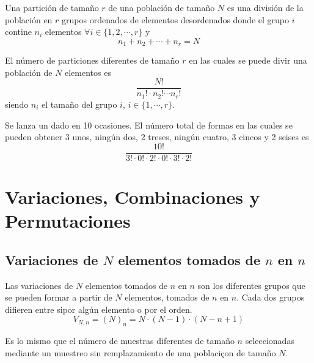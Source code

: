 \begin{defn}[Partición]
  Una partición de tamaño $r$ de una población de tamaño $N$ es una división de la población en $r$ grupos ordenados de elementos desordenados donde el grupo $i$ contine $n_{i}$ elementos $\forall i \in \{ 1,2, \cdots, r \}$ y
  \[ 
    n_{1} + n_{2} + \cdots + n_{r} = N 
  \] 
\end{defn}

\begin{theo}
  El número de particiones diferentes de tamaño $r$ en las cuales se puede divir una población de $N$ elementos es
  \[ 
    \frac{N!}{n_{1}! \cdot n_{2}! \cdots n_{r}!} 
  \] 
  siendo $n_{i}$ el tamaño del grupo $i$, $i \in \{ 1, \cdots, r \}$.
\end{theo}

\begin{ejm}
  Se lanza un dado en 10 ocasiones. El número total de formas en las cuales se pueden obtener $3$ unos, ningún dos, 2 treses, ningún cuatro, 3 cincos y 2 seises es
  \[ 
    \frac{10!}{3! \cdot 0! \cdot 2! \cdot 0! \cdot 3! \cdot 2!} 
  \] 
\end{ejm}


\section{Variaciones, Combinaciones y Permutaciones}

\subsection{Variaciones de $N$ elementos tomados de $n$ en $n$}

\begin{defn}
  Las variaciones de $N$ elementos tomados de $n$ en $n$ son los diferentes grupos que se pueden formar a partir de $N$ elementos, tomados de $n$ en $n$. Cada dos grupos difieren entre sipor algún elemento o por el orden.
  \[ 
    V_{N, n} = (N)_{n} = N \cdot (N - 1) \cdot (N - n +1)
  \] 
\end{defn}

\begin{obs}
  Es lo mismo que el número de muestras diferentes de tamaño $n$ seleccionadas mediante un muestreo sin remplazamiento de una poblaciçon de tamaño $N$.
\end{obs}

